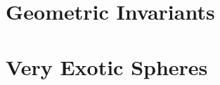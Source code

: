 \documentclass{lkx_thesis}
\begin{document}
\chapter{Geometric Invariants}\label{chap:detection}


\chapter{Very Exotic Spheres}\label{chap:classification}


% 
%
% 
%
% 
%
% 

\begin{appendices}
\end{appendices}

\lkxrefs
\lkxindex
\end{document}

